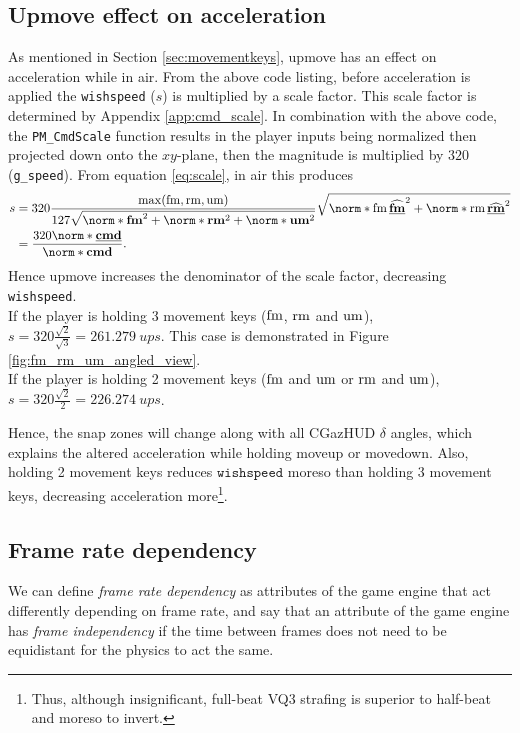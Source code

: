 \subsection{Upmove effect on acceleration}
As mentioned in Section \ref{sec:movementkeys}, upmove has an effect on acceleration while in air.
\label{sec:upmove}
From the above code listing, before acceleration is applied the \texttt{wishspeed} ($s$) is multiplied by a scale factor.
This scale factor is determined by Appendix \ref{app:cmd_scale}. In combination with the above code, the \texttt{PM\_CmdScale} function results in the player inputs being normalized then projected down onto the $xy$-plane, then the magnitude is multiplied by $320$ (\texttt{g\_speed}).
From equation \eqref{eq:scale}, in air this produces
\begin{align}
\nonumber
s &= 320\frac{\max(\fmove, \rmove, \umove)}{127\sqrt{\norm*{\tvec{\fmove}}^2 + \norm*{\tvec{\rmove}}^2 + \norm*{\tvec{\umove}}^2}}\sqrt{\norm*{\fmove \tuvec*{\flat{\fmove}}}^2 + \norm*{\rmove \tuvec*{\flat{\rmove}}}^2}\\
\label{eq:s_in_air}
&= \frac{320\norm*{\tvec{\flat{\cmd}}}}{\norm*{\tvec{\cmd}}}.
\end{align}
Hence upmove increases the denominator of the scale factor, decreasing \texttt{wishspeed}.\\
If the player is holding 3 movement keys ($\operatorname{fm}$, $\operatorname{rm}$ and $\operatorname{um}$), $s = 320\frac{\sqrt{2}}{\sqrt{3}} = \qty{261.279}{ups}$. This case is demonstrated in Figure \ref{fig:fm_rm_um_angled_view}.\\
If the player is holding 2 movement keys ($\operatorname{fm}$ and $\operatorname{um}$ or $\operatorname{rm}$ and $\operatorname{um}$), $s = 320\frac{\sqrt{2}}{2} = \qty{226.274}{ups}$.

Hence, the snap zones will change along with all CGazHUD $\delta$ angles, which explains the altered acceleration while holding moveup or movedown.
Also, holding 2 movement keys reduces $\texttt{wishspeed}$ moreso than holding 3 movement keys, decreasing acceleration more\footnote{Thus, although insignificant, full-beat VQ3 strafing is superior to half-beat and moreso to invert.}.


\subsection{Frame rate dependency}
\label{sec:framerate}
We can define \emph{frame rate dependency} as attributes of the game engine that act differently depending on frame rate,
and say that an attribute of the game engine has \emph{frame independency} if the time between frames does not need to be equidistant for the physics to act the same.\\

